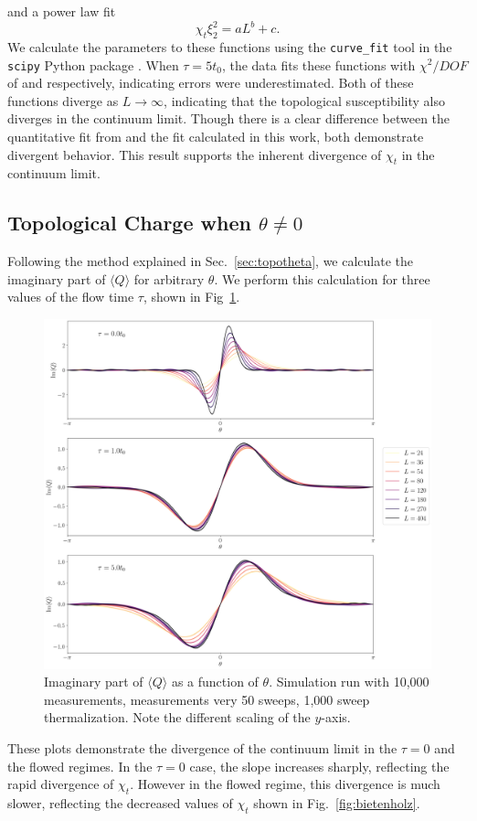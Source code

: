 and a power law fit
\begin{equation}
    \chi_t \xi_2^2 = a L^b + c.
\end{equation}
We calculate the parameters to these functions using the \texttt{curve\_fit} tool in the \texttt{scipy} Python package \cite{virtanen2020}. When $\tau=5t_0$, the data fits these functions with $\chi^2/DOF$ of \logchi and \powchi respectively, indicating errors were underestimated. Both of these functions diverge as $L\rightarrow \infty$, indicating that the topological susceptibility also diverges in the continuum limit. Though there is a clear difference between the quantitative fit from \cite{bietenholz2018} and the fit calculated in this work, both demonstrate divergent behavior. This result supports the inherent divergence of $\chi_t$ in the continuum limit.


\subsection{Topological Charge when $\theta\neq 0$}

Following the method explained in Sec.~\ref{sec:topotheta}, we calculate the imaginary part of $\langle Q \rangle$ for arbitrary $\theta$. We perform this calculation for three values of the flow time $\tau$, shown in Fig~\ref{fig:theta}.
\begin{figure}[h!]
    \centering
      \includegraphics[width=\textwidth]{imgs/theta.png}
      \caption{\label{fig:theta} Imaginary part of $\langle Q \rangle$ as a function of $\theta$. Simulation run with 10,000 measurements, measurements very 50 sweeps, 1,000 sweep thermalization. Note the different scaling of the $y$-axis.}
\end{figure}
These plots demonstrate the divergence of the continuum limit in the $\tau=0$ and the flowed regimes. In the $\tau=0$ case, the slope increases sharply, reflecting the rapid divergence of $\chi_t$. However in the flowed regime, this divergence is much slower, reflecting the decreased values of $\chi_t$ shown in Fig.~\ref{fig:bietenholz}.


